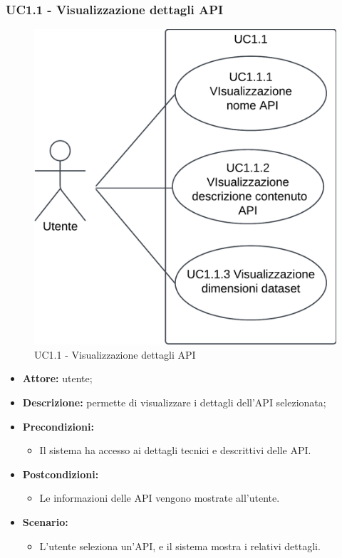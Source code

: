 \subsubsection{UC1.1 - Visualizzazione dettagli API}
\begin{figure}[h!]
    \centering
    \includegraphics[scale=0.7]{template/images/UC1.1_1.1.1_1.1.2_1.1.3.png}
    \caption{UC1.1 - Visualizzazione dettagli API}
\end{figure}
\begin{itemize}
    \item \textbf{Attore:} utente;
    \item \textbf{Descrizione:} permette di visualizzare i dettagli dell'API selezionata;
    \item \textbf{Precondizioni:}
    \begin{itemize}
        \item Il sistema ha accesso ai dettagli tecnici e descrittivi delle API.
    \end{itemize}
    \item \textbf{Postcondizioni:}
    \begin{itemize}
        \item Le informazioni delle API vengono mostrate all'utente.
    \end{itemize}
    \item \textbf{Scenario:}
    \begin{itemize}
        \item L'utente seleziona un'API, e il sistema mostra i relativi dettagli.
    \end{itemize}
\end{itemize}
